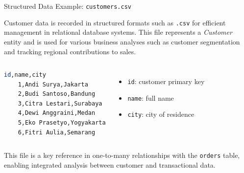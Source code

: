 \documentclass[aspectratio=169, table]{beamer}
\begin{document}
\begin{frame}[fragile]{Structured Data Example: \texttt{customers.csv}}
\vspace{20pt}

Customer data is recorded in structured formats such as \texttt{.csv} for efficient management in relational database systems. This file represents a \emph{Customer} entity and is used for various business analyses such as customer segmentation and tracking regional contributions to sales.

\begin{columns}[T,onlytextwidth]

\begin{lstlisting}[language=bash, caption={file \texttt{customers.csv}}, basicstyle=\ttfamily\scriptsize, label={lst:customers_csv}]
	id,name,city
	1,Andi Surya,Jakarta
	2,Budi Santoso,Bandung
	3,Citra Lestari,Surabaya
	4,Dewi Anggraini,Medan
	5,Eko Prasetyo,Yogyakarta
	6,Fitri Aulia,Semarang
\end{lstlisting}

\begin{itemize}
	\item \texttt{id}: customer primary key  
	\item \texttt{name}: full name  
	\item \texttt{city}: city of residence  
\end{itemize}

\end{columns}

This file is a key reference in one-to-many relationships with the \texttt{orders} table, enabling integrated analysis between customer and transactional data.

\end{frame}
\end{document}
